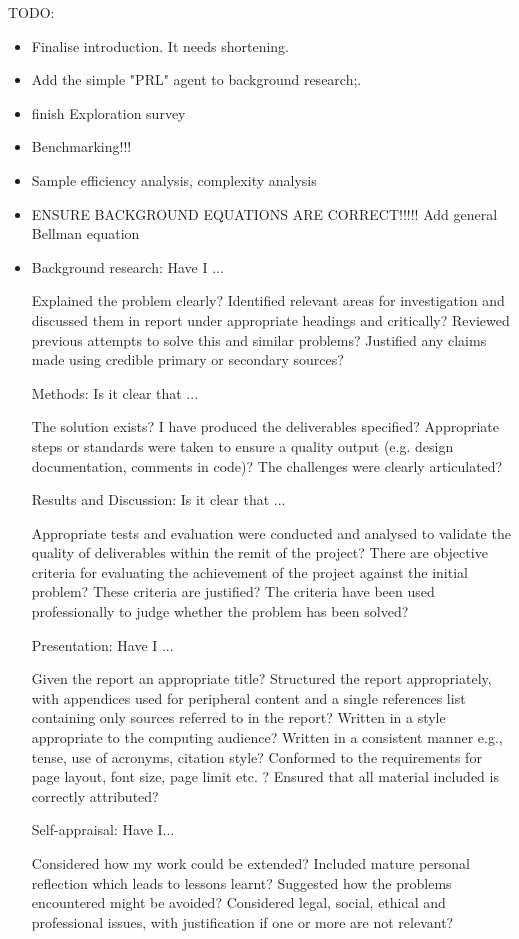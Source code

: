 TODO:
\begin{itemize}
    \item Finalise introduction. It needs shortening.
    \item Add the simple "PRL" agent to background research;.
    \item finish Exploration survey
    \item Benchmarking!!!
    \item Sample efficiency analysis, complexity analysis
    \item ENSURE BACKGROUND EQUATIONS ARE CORRECT!!!!! Add general Bellman equation
    \item
Background research: Have I ...

    Explained the problem clearly?
    Identified relevant areas for investigation and discussed them in report under appropriate headings and critically?
    Reviewed previous attempts to solve this and similar problems?
    Justified any claims made using credible primary or secondary sources?


Methods: Is it clear that ...

    The solution exists?
    I have produced the deliverables specified?
    Appropriate steps or standards were taken to ensure a quality output (e.g. design documentation, comments in code)?
    The challenges were clearly articulated?


Results and Discussion: Is it clear that ...

    Appropriate tests and evaluation were conducted and analysed to validate the quality of deliverables within the remit of the project?
    There are objective criteria for evaluating the achievement of the project against the initial problem?
    These criteria are justified?
    The criteria have been used professionally to judge whether the problem has been solved?


Presentation: Have I ...

    Given the report an appropriate title?
    Structured the report appropriately, with appendices used for peripheral content and a single references list containing only sources referred to in the report?
    Written in a style appropriate to the computing audience?
    Written in a consistent manner e.g., tense, use of acronyms, citation style?
    Conformed to the requirements for page layout, font size, page limit etc. ?
    Ensured that all material included is correctly attributed?


Self-appraisal: Have I...

    Considered how my work could be extended?
    Included mature personal reflection which leads to lessons learnt?
    Suggested how the problems encountered might be avoided?
    Considered legal, social, ethical and professional issues, with justification if one or more are not relevant?
\end{itemize}